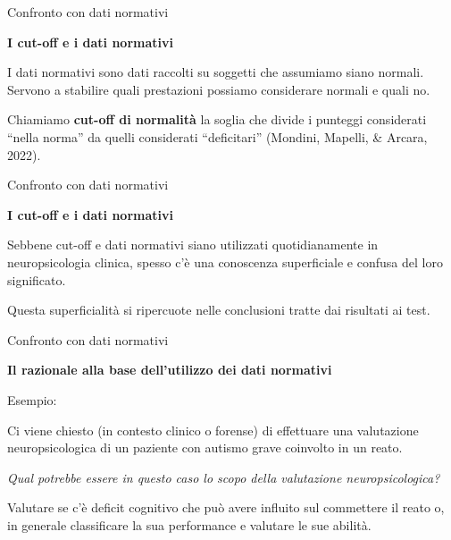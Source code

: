 \documentclass[
  ignorenonframetext,
  aspectratio=169,
]{beamer}
\begin{document}
\begin{frame}{Confronto con dati normativi}
\label{confronto-con-dati-normativi-2}
\begin{center}
  \textbf{I  cut-off e i dati normativi}
\end{center}

I dati normativi sono dati raccolti su soggetti che assumiamo siano
normali. Servono a stabilire quali prestazioni possiamo considerare
normali e quali no. \vspace{2em}

Chiamiamo \textbf{cut-off di normalità} la soglia che divide i punteggi
considerati ``nella norma'' da quelli considerati ``deficitari''
(Mondini, Mapelli, \& Arcara, 2022).
\end{frame}

\begin{frame}{Confronto con dati normativi}
\label{confronto-con-dati-normativi-3}
\begin{center}
  \textbf{I  cut-off e i dati normativi}
\end{center}

Sebbene cut-off e dati normativi siano utilizzati quotidianamente in
neuropsicologia clinica, spesso c'è una conoscenza superficiale e
confusa del loro significato. \vspace{2em}

Questa superficialità si ripercuote nelle conclusioni tratte dai
risultati ai test.
\end{frame}

\begin{frame}{Confronto con dati normativi}
\label{confronto-con-dati-normativi-4}
\begin{center}
  \textbf{Il razionale alla base dell’utilizzo dei dati normativi}
\end{center}

Esempio:

Ci viene chiesto (in contesto clinico o forense) di effettuare una
valutazione neuropsicologica di un paziente con autismo grave coinvolto
in un reato.

\emph{Qual potrebbe essere in questo caso lo scopo della valutazione
neuropsicologica?} \pause

Valutare se c'è deficit cognitivo che può avere influito sul commettere
il reato o, in generale classificare la sua performance e valutare le
sue abilità.
\end{frame}
\end{document}
